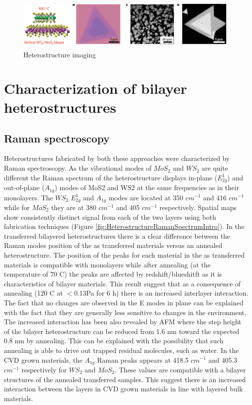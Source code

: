 \begin{figure}[h]
	\begin{center}
		\includegraphics[scale=1]{Heterostructures/HeterostructureOpticalSEMAFMImages.png}
		\caption{Heterostructure imaging}
		\label{fig:HeterostructuresOpticalSEMAFMImages}
	\end{center}
\end{figure}

\section{Characterization of bilayer heterostructures}

\subsection{Raman spectroscopy}

Heterostructures fabricated by both these approaches were characterized by Raman spectroscopy. As the vibrational modes of $MoS_2$ and $WS_2$ are quite different the Raman spectrum of the heterostructure displays in-plane ($E^1_{2g}$) and out-of-plane ($A_{1g}$) modes of MoS2 and WS2 at the same frequencies as in their monolayers. The $WS_2$ $E^1_{2g}$ and $A_{1g}$ modes are located at 350 $cm^{-1}$ and 416 $cm^{-1}$ while for $MoS_2$ they are at 380 $cm^{-1}$ and 405 $cm^{-1}$ respectively. Spatial maps show consistently distinct signal from each of the two layers using both fabrication techniques (Figure \ref{fig:HeterostructureRamanSpectrumIntro}). In the transferred bilayered heterostructures there is a clear difference  between the Raman modes position of the as transferred materials versus an annealed heterostructure. The position of the peaks for each material in the as transferred materials is compatible with  monolayers while after annealing (at the temperature of 70 {\degree}C) the peaks are affected by redshift/blueshitft as it is characteristics of bilayer materials. This result suggest that as a consequence of annealing (120 {\degree}C at $<$0.13Pa for 6 h) there is an increased interlayer interaction. The fact that no changes are observed in the E modes in plane can be explained with the fact that they are generally less sensitive to changes in the environment. The increased interaction has been also revealed by AFM where the step height of the bilayer heterostructure can be reduced from 1.6 nm toward the expected 0.8 nm by annealing. This can be explained with the possibility that such annealing is able to drive out trapped residual molecules, such as water. In the CVD grown materials, the $A_{1g}$ Raman peaks appears at 418.5 $cm^{-1}$ and 405.3 $cm^{-1}$ respectively for $WS_2$ and $MoS_2$. These values are compatible with a bilayer structures of the annealed transferred samples. This suggest there is an increased interaction between the layers in CVD grown materials in line with layered bulk materials.

